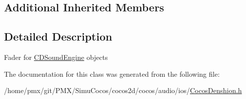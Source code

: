 \subsection*{Additional Inherited Members}


\subsection{Detailed Description}
Fader for \hyperlink{interfaceCDSoundEngine}{C\+D\+Sound\+Engine} objects 

The documentation for this class was generated from the following file\+:\begin{DoxyCompactItemize}
\item 
/home/pmx/git/\+P\+M\+X/\+Simu\+Cocos/cocos2d/cocos/audio/ios/\hyperlink{cocos2d_2cocos_2audio_2ios_2CocosDenshion_8h}{Cocos\+Denshion.\+h}\end{DoxyCompactItemize}
